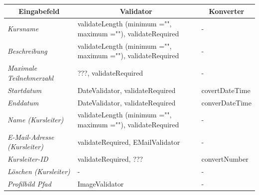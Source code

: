 \begin{itemize}
\begin{center}
\begin{longtable}{|p{3cm} |p{8cm} | p{5cm}|}
						\hline \multicolumn{1}{|c|}{\textbf{Eingabefeld}} & \multicolumn{1}{|c|}{\textbf{Validator}} & \multicolumn{1}{|c|}{\textbf{Konverter}} \\ \hline
						\endfirsthead
						\hline
						\endlastfoot
						\textit{Kursname} & validateLength (minimum ="", maximum =""), validateRequired & - \\ \hline
						\textit{Beschreibung} & validateLength (minimum ="", maximum =""), validateRequired & - \\ \hline
						\textit{Maximale Teilnehmerzahl} & ???, validateRequired & - \\ \hline
						\textit{Startdatum} & DateValidator, validateRequired & covertDateTime \\ \hline
						\textit{Enddatum} & DateValidator, validateRequired & converDateTime \\ \hline
						\textit{Name (Kursleiter)} & validateLength (minimum ="", maximum =""), validateRequired & - \\ \hline
						\textit{E-Mail-Adresse (Kursleiter)} & validateRequired, EMailValidator & - \\ \hline
						\textit{Kursleiter-ID} & validateRequired, ??? & convertNumber \\ \hline
						\textit{Löschen (Kursleiter)} & - & - \\ \hline
						\textit{Profilbild Pfad} & ImageValidator & - \\ \hline
					\end{longtable}
				\end{center}
				

\end{itemize}
